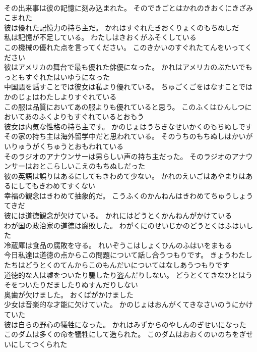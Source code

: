\documentclass[8pt]{extreport}
\begin{document}
\begin{CJK}{UTF8}{min}
\\	その出来事は彼の記憶に刻み込まれた。	そのできごとはかれのきおくにきざみこまれた 
\\	彼は優れた記憶力の持ち主だ。	かれはすぐれたきおくりょくのもちぬしだ 
\\	私は記憶が不足している。	わたしはきおくがふそくしている 
\\	この機械の優れた点を言ってください。	このきかいのすぐれたてんをいってください 
\\	彼はアメリカの舞台で最も優れた俳優になった。	かれはアメリカのぶたいでもっともすぐれたはいゆうになった 
\\	中国語を話すことでは彼女は私より優れている。	ちゅごくごをはなすことではかのじょはわたしよりすぐれている 
\\	この服は品質においてあの服よりも優れていると思う。	このふくはひんしつにおいてあのふくよりもすぐれているとおもう 
\\	彼女は内気な性格の持ち主です。	かのじょはうちきなせいかくのもちぬしです 
\\	その家の持ち主は海外留学中だと思われている。	そのうちのもちぬしはかいがいりゅうがくちゅうとおもわれている 
\\	そのラジオのアナウンサーは男らしい声の持ち主だった。	そのラジオのアナウンサーはおとこらしいこえのもちぬしだった 
\\	彼の英語は誤りはあるにしてもきわめて少ない。	かれのえいごはあやまりはあるにしてもきわめてすくない 
\\	幸福の観念はきわめて抽象的だ。	こうふくのかんねんはきわめてちゅうしょうてきだ 
\\	彼には道徳観念が欠けている。	かれにはどうとくかんねんがかけている 
\\	わが国の政治家の道徳は腐敗した。	わがくにのせいじかのどうとくはふはいした 
\\	冷蔵庫は食品の腐敗を守る。	れいぞうこはしょくひんのふはいをまもる 
\\	今日私達は道徳の点からこの問題について話し合うつもりです。	きょうわたしたちはどうとくのてんからこのもんだいについてはなしあうつもりです 
\\	道徳的な人は嘘をついたり騙したり盗んだりしない。	どうとくてきなひとはうそをついたりだましたりぬすんだりしない 
\\	奥歯が欠けました。	おくばがかけました 
\\	少女は音楽的な才能に欠けていた。	かのじょはおんがくてきなさいのうにかけていた 
\\	彼は自らの野心の犠牲になった。	かれはみずからのやしんのぎせいになった 
\\	このダムは多くの命を犠牲にして造られた。	このダムはおおくのいのちをぎせいにしてつくられた 

\end{CJK}
\end{document}
